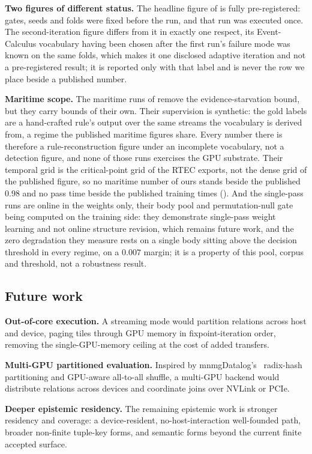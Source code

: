 \textbf{Two figures of different status.} The headline figure of  is fully pre-registered: gates, seeds and folds were fixed before the run, and that run was executed once. The second-iteration figure differs from it in exactly one respect, its Event-Calculus vocabulary having been chosen after the first run's failure mode was known on the same folds, which makes it one disclosed adaptive iteration and not a pre-registered result; it is reported only with that label and is never the row we place beside a published number.

\textbf{Maritime scope.} The maritime runs of  remove the evidence-starvation bound, but they carry bounds of their own. Their supervision is synthetic: the gold labels are a hand-crafted rule's output over the same streams the vocabulary is derived from, a regime the published maritime figures share. Every number there is therefore a rule-reconstruction figure under an incomplete vocabulary, not a detection figure, and none of those runs exercises the GPU substrate. Their temporal grid is the critical-point grid of the RTEC exports, not the dense grid of the published figure, so no maritime number of ours stands beside the published $0.98$ and no pass time beside the published training times (). And the single-pass runs are online in the weights only, their body pool and permutation-null gate being computed on the training side: they demonstrate single-pass weight learning and not online structure revision, which remains future work, and the zero degradation they measure rests on a single body sitting above the decision threshold in every regime, on a $0.007$ margin; it is a property of this pool, corpus and threshold, not a robustness result.

\subsection{Future work}

\textbf{Out-of-core execution.} A streaming mode would partition relations across host and device, paging tiles through GPU memory in fixpoint-iteration order, removing the single-GPU-memory ceiling at the cost of added transfers.

\textbf{Multi-GPU partitioned evaluation.} Inspired by mnmgDatalog's~\cite{mnmgdatalog} radix-hash partitioning and GPU-aware all-to-all shuffle, a multi-GPU backend would distribute relations across devices and coordinate joins over NVLink or PCIe.

\textbf{Deeper epistemic residency.} The remaining epistemic work is stronger residency and coverage: a device-resident, no-host-interaction well-founded path, broader non-finite tuple-key forms, and semantic forms beyond the current finite accepted surface.

